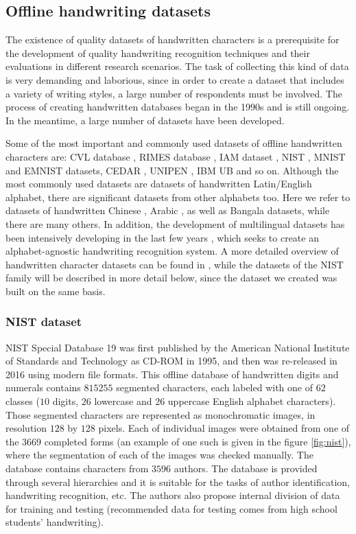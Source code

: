 \documentclass[eng]{simposium}
\begin{document}
\subsection{Offline handwriting datasets} 

The existence of quality datasets of handwritten characters is a prerequisite for the development of quality handwriting  
recognition techniques and their evaluations in different research scenarios.  
The task of collecting this kind of data is very demanding and laborious, since in order to create a dataset that includes  
a variety of writing styles, a large number of respondents must be involved.  
The process of creating handwritten databases began in the 1990s\cite{9} and is still ongoing.  
In the meantime, a large number of datasets have been developed.  

Some of the most important and commonly used datasets of offline handwritten characters are: CVL database \cite{18}, RIMES database \cite{10}, 
IAM dataset \cite{11},  
NIST \cite{12}\cite{13}, MNIST \cite{8} and EMNIST \cite{1} datasets, CEDAR \cite{14}, UNIPEN \cite{15}, IBM UB \cite{16} and so on.  
Although the most commonly used datasets are datasets of handwritten Latin/English alphabet,  
there are significant datasets from other alphabets too.  
Here we refer to datasets of handwritten Chinese \cite{19}\cite{20}\cite{21}, Arabic \cite{22}\cite{23}, as well as Bangala \cite{24}\cite{25} datasets, 
while there are many others.  
In addition, the development of multilingual datasets has been intensively developing in the last few years \cite{17}\cite{26}\cite{18}, 
which seeks to create an alphabet-agnostic handwriting recognition system.  
A more detailed overview of handwritten character datasets can be found in \cite{9},  
while the datasets of the NIST family will be described in more detail below, since the dataset we created was built on the same basis.  

\subsubsection{NIST dataset} 

NIST Special Database 19 \cite{12}\cite{13} was first published by the American National Institute of Standards and Technology as CD-ROM in 1995, and then was  
re-released in 2016 using modern file formats.  
This offline database of handwritten digits and numerals contains $815255$ segmented characters, each labeled  
with one of $62$ classes ($10$ digits, $26$ lowercase and $26$ uppercase English alphabet characters).  
Those segmented characters are represented as monochromatic images, in resolution $128$ by $128$ pixels.  
Each of individual images were obtained from one of the $3669$ completed forms (an example of one such is given in the figure \ref{fig:nist}),  
where the segmentation of each of the images was checked manually.  
The database contains characters from $3596$ authors.  
The database is provided through several hierarchies and it is suitable for the tasks of author identification, handwriting recognition, etc.  
The authors also propose internal division of data for training and testing  
(recommended data for testing comes from high school students' handwriting).  
\end{document}
